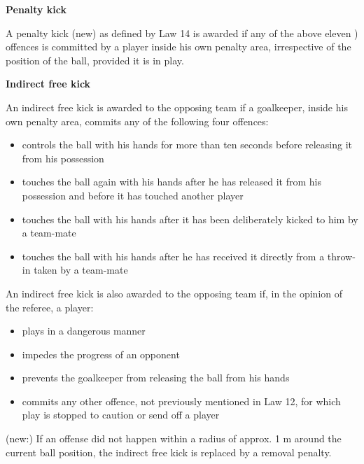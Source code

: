 \bigskip

{\bfseries Penalty kick}

\headlinebox

A penalty kick (new) as defined by Law 14 is awarded if any of the above eleven ) offences is committed by a player inside his own penalty area, irrespective of the position of the ball, provided it is in play.


\bigskip

{\bfseries Indirect free kick}

\headlinebox

An indirect free kick is awarded to the opposing team if a goalkeeper, inside his own penalty area, commits any of the following four offences: 

\begin{itemize}
\item controls the ball with his hands for more than ten seconds before releasing it from his possession
\item touches the ball again with his hands after he has released it from his possession and before it has touched another player
\item touches the ball with his hands after it has been deliberately kicked to him by a team-mate
\item touches the ball with his hands after he has received it directly from a throw-in taken by a team-mate
\end{itemize}

\bigskip

An indirect free kick is also awarded to the opposing team if, in the opinion of the referee, a player:

\begin{itemize}
\item plays in a dangerous manner
\item impedes the progress of an opponent
\item prevents the goalkeeper from releasing the ball from his hands
\item commits any other offence, not previously mentioned in Law 12, for which play is stopped to caution or send off a player
\end{itemize}

\bigskip

(new:) If an offense did not happen within a radius of approx. 1 m around the current ball position, the indirect free kick is replaced by a removal penalty.

\bigskip

